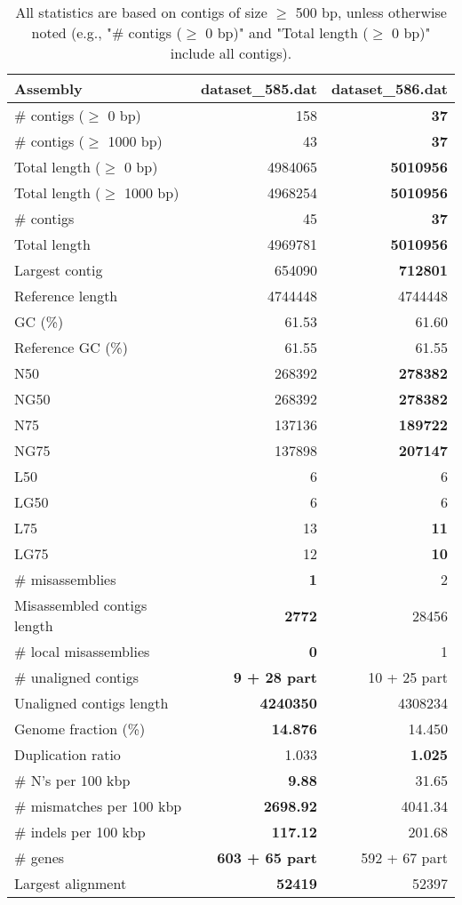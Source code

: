 \documentclass[12pt,a4paper]{article}
\begin{document}
\begin{table}[ht]
\begin{center}
\caption{All statistics are based on contigs of size $\geq$ 500 bp, unless otherwise noted (e.g., "\# contigs ($\geq$ 0 bp)" and "Total length ($\geq$ 0 bp)" include all contigs).}
\begin{tabular}{|l*{2}{|r}|}
\hline
Assembly & dataset\_585.dat & dataset\_586.dat \\ \hline
\# contigs ($\geq$ 0 bp) & 158 & {\bf 37} \\ \hline
\# contigs ($\geq$ 1000 bp) & 43 & {\bf 37} \\ \hline
Total length ($\geq$ 0 bp) & 4984065 & {\bf 5010956} \\ \hline
Total length ($\geq$ 1000 bp) & 4968254 & {\bf 5010956} \\ \hline
\# contigs & 45 & {\bf 37} \\ \hline
Total length & 4969781 & {\bf 5010956} \\ \hline
Largest contig & 654090 & {\bf 712801} \\ \hline
Reference length & 4744448 & 4744448 \\ \hline
GC (\%) & 61.53 & 61.60 \\ \hline
Reference GC (\%) & 61.55 & 61.55 \\ \hline
N50 & 268392 & {\bf 278382} \\ \hline
NG50 & 268392 & {\bf 278382} \\ \hline
N75 & 137136 & {\bf 189722} \\ \hline
NG75 & 137898 & {\bf 207147} \\ \hline
L50 & 6 & 6 \\ \hline
LG50 & 6 & 6 \\ \hline
L75 & 13 & {\bf 11} \\ \hline
LG75 & 12 & {\bf 10} \\ \hline
\# misassemblies & {\bf 1} & 2 \\ \hline
Misassembled contigs length & {\bf 2772} & 28456 \\ \hline
\# local misassemblies & {\bf 0} & 1 \\ \hline
\# unaligned contigs & {\bf 9 + 28 part} & 10 + 25 part \\ \hline
Unaligned contigs length & {\bf 4240350} & 4308234 \\ \hline
Genome fraction (\%) & {\bf 14.876} & 14.450 \\ \hline
Duplication ratio & 1.033 & {\bf 1.025} \\ \hline
\# N's per 100 kbp & {\bf 9.88} & 31.65 \\ \hline
\# mismatches per 100 kbp & {\bf 2698.92} & 4041.34 \\ \hline
\# indels per 100 kbp & {\bf 117.12} & 201.68 \\ \hline
\# genes & {\bf 603 + 65 part} & 592 + 67 part \\ \hline
Largest alignment & {\bf 52419} & 52397 \\ \hline
\end{tabular}
\end{center}
\end{table}
\end{document}

